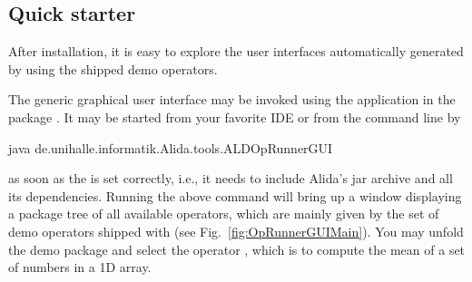 \subsection{Quick starter}
\label{subsec:quickstart}

After installation, it is easy to explore the user interfaces automatically
generated by \alida using the shipped demo operators.

The generic graphical user interface may be invoked using the application
 in the package
.
It may be started from your favorite IDE or from the command line by
\vspace*{0.5cm}
\begin{code}
        java de.unihalle.informatik.Alida.tools.ALDOpRunnerGUI
\end{code}

\vspace*{-0.25cm}
as soon as the  is set correctly, i.e., it needs to include
Alida's jar archive and all its dependencies. Running the above command will
bring up a window displaying a package tree of all available operators, which
are mainly given by the set of demo operators shipped with \alida (see
Fig.~\ref{fig:OpRunnerGUIMain}). You may unfold the demo package and select the
operator , which is to compute the mean of a set of
numbers in a 1D array.

